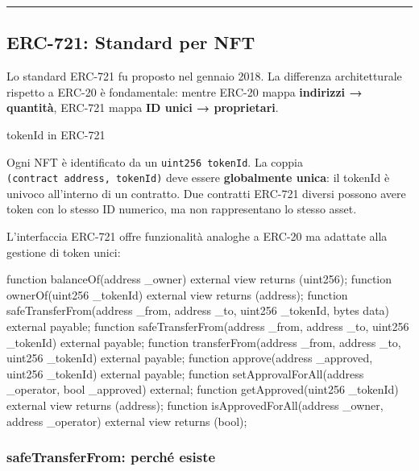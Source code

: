 \documentclass[
  italian,
  openany]{book}
\newenvironment{Shaded}{\begin{snugshade}}{\end{snugshade}}
\newcommand{\NormalTok}[1]{#1}
\begin{document}
\begin{center}\rule{0.5\linewidth}{0.5pt}\end{center}

\subsection{ERC-721: Standard per NFT}\label{erc-721-standard-per-nft}

Lo standard ERC-721 fu proposto nel gennaio 2018. La differenza
architetturale rispetto a ERC-20 è fondamentale: mentre ERC-20 mappa
\textbf{indirizzi → quantità}, ERC-721 mappa \textbf{ID unici →
proprietari}.

\begin{calloutdefinition}{tokenId in ERC-721}

Ogni NFT è identificato da un \texttt{uint256\ tokenId}. La coppia
\texttt{(contract\ address,\ tokenId)} deve essere \textbf{globalmente
unica}: il tokenId è univoco all'interno di un contratto. Due contratti
ERC-721 diversi possono avere token con lo stesso ID numerico, ma non
rappresentano lo stesso asset.

\end{calloutdefinition}

L'interfaccia ERC-721 offre funzionalità analoghe a ERC-20 ma adattate
alla gestione di token unici:

\begin{Shaded}
\begin{Highlighting}[]
\NormalTok{function balanceOf(address \_owner) external view returns (uint256);}
\NormalTok{function ownerOf(uint256 \_tokenId) external view returns (address);}
\NormalTok{function safeTransferFrom(address \_from, address \_to, uint256 \_tokenId, bytes data) external payable;}
\NormalTok{function safeTransferFrom(address \_from, address \_to, uint256 \_tokenId) external payable;}
\NormalTok{function transferFrom(address \_from, address \_to, uint256 \_tokenId) external payable;}
\NormalTok{function approve(address \_approved, uint256 \_tokenId) external payable;}
\NormalTok{function setApprovalForAll(address \_operator, bool \_approved) external;}
\NormalTok{function getApproved(uint256 \_tokenId) external view returns (address);}
\NormalTok{function isApprovedForAll(address \_owner, address \_operator) external view returns (bool);}
\end{Highlighting}
\end{Shaded}

\subsubsection{safeTransferFrom: perché
esiste}\label{safetransferfrom-perchuxe9-esiste}
\end{document}
